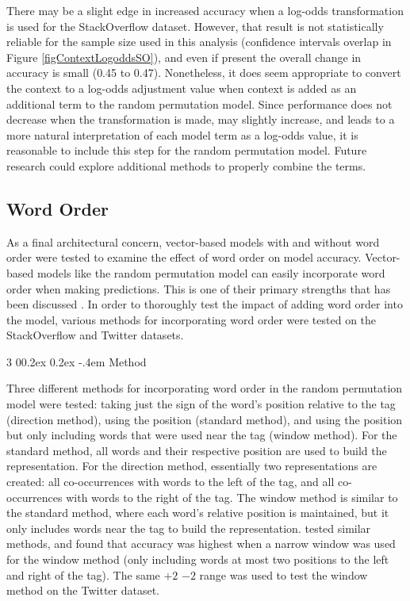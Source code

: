 \documentclass[man,floatsintext,donotrepeattitle]{apa6}
\makeatletter
\renewcommand{\subsubsection}{%
  \@startsection
  {subsubsection}%
  {3}%
  {\parindent}%
  {0\baselineskip \@plus 0.2ex \@minus 0.2ex}%
  {-.4em}%
  {\normalfont\normalsize\bfseries\addperi}}
\newcommand{\numNoZero}[1]{{\sisetup{add-integer-zero=false}\num{#1}}}
\makeatother
\begin{document}
There may be a slight edge in increased accuracy when a log-odds transformation is used for the StackOverflow dataset.
However, that result is not statistically reliable for the sample size used in this analysis (confidence intervals overlap in Figure \ref{figContextLogoddsSO}),
and even if present the overall change in accuracy is small (\numNoZero{.45} to \numNoZero{.47}).
Nonetheless, it does seem appropriate to convert the context to a log-odds adjustment value when context is added as an additional term to the random permutation model.
Since performance does not decrease when the transformation is made, may slightly increase,
and leads to a more natural interpretation of each model term as a log-odds value, it is reasonable to include this step for the random permutation model.
Future research could explore additional methods to properly combine the terms.

\subsection{Word Order}

As a final architectural concern, vector-based models with and without word order were tested to examine the effect of word order on model accuracy.
Vector-based models like the random permutation model can easily incorporate word order when making predictions.
This is one of their primary strengths that has been discussed \parencites{Jones2007, Sahlgren2008}.
In order to thoroughly test the impact of adding word order into the model, various methods for incorporating word order were tested on the StackOverflow and Twitter datasets.

\subsubsection{Method}

Three different methods for incorporating word order in the random permutation model were tested:
taking just the sign of the word's position relative to the tag (direction method), using the position (standard method), and using the position but only including words that were used near the tag (window method).
For the standard method, all words and their respective position are used to build the representation.
For the direction method, essentially two representations are created: all co-occurrences with words to the left of the tag, and all co-occurrences with words to the right of the tag.
The window method is similar to the standard method, where each word's relative position is maintained, but it only includes words near the tag to build the representation.
\textcite{Sahlgren2008} tested similar methods, and found that accuracy was highest when a narrow window was used for the window method (only including words at most two positions to the left and right of the tag).
The same $+2$ $-2$ range was used to test the window method on the Twitter dataset.
\end{document}
